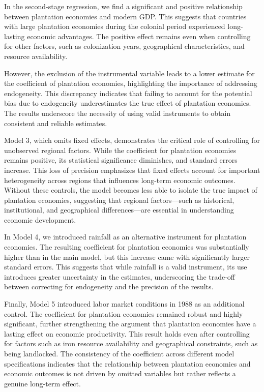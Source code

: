 \documentclass[12pt]{article}
\begin{document}
\noindent In the second-stage regression, we find a significant and positive relationship between plantation economies and modern GDP. This suggests that countries with large plantation economies during the colonial period experienced long-lasting economic advantages. The positive effect remains even when controlling for other factors, such as colonization years, geographical characteristics, and resource availability.

\noindent However, the exclusion of the instrumental variable leads to a lower estimate for the coefficient of plantation economies, highlighting the importance of addressing endogeneity. This discrepancy indicates that failing to account for the potential bias due to endogeneity underestimates the true effect of plantation economies. The results underscore the necessity of using valid instruments to obtain consistent and reliable estimates.

\noindent Model 3, which omits fixed effects, demonstrates the critical role of controlling for unobserved regional factors. While the coefficient for plantation economies remains positive, its statistical significance diminishes, and standard errors increase. This loss of precision emphasizes that fixed effects account for important heterogeneity across regions that influences long-term economic outcomes. Without these controls, the model becomes less able to isolate the true impact of plantation economies, suggesting that regional factors—such as historical, institutional, and geographical differences—are essential in understanding economic development.

\noindent In Model 4, we introduced rainfall as an alternative instrument for plantation economies. The resulting coefficient for plantation economies was substantially higher than in the main model, but this increase came with significantly larger standard errors. This suggests that while rainfall is a valid instrument, its use introduces greater uncertainty in the estimates, underscoring the trade-off between correcting for endogeneity and the precision of the results.

\noindent Finally, Model 5 introduced labor market conditions in 1988 as an additional control. The coefficient for plantation economies remained robust and highly significant, further strengthening the argument that plantation economies have a lasting effect on economic productivity. This result holds even after controlling for factors such as iron resource availability and geographical constraints, such as being landlocked. The consistency of the coefficient across different model specifications indicates that the relationship between plantation economies and economic outcomes is not driven by omitted variables but rather reflects a genuine long-term effect.
\end{document}
